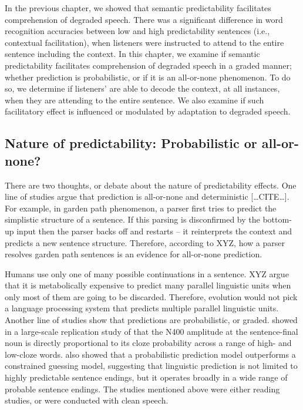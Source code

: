 \documentclass[a4paper, nobind]{templates/ociamthesis}
\begin{document}
In the previous chapter, we showed that semantic predictability facilitates comprehension of degraded speech.
There was a significant difference in word recognition accuracies between low and high predictability sentences (i.e., contextual facilitation), when listeners were instructed to attend to the entire sentence including the context.
In this chapter, we examine if semantic predictability facilitates comprehension of degraded speech in a graded manner; whether prediction is probabilistic, or if it is an all-or-none phenomenon.
To do so, we determine if listeners' are able to decode the context, at all instances, when they are attending to the entire sentence.
We also examine if such facilitatory effect is influenced or modulated by adaptation to degraded speech.

\hypertarget{nature-of-predictability-probabilistic-or-all-or-none}{%
\subsection{Nature of predictability: Probabilistic or all-or-none?}\label{nature-of-predictability-probabilistic-or-all-or-none}}

There are two thoughts, or debate about the nature of predictability effects.
One line of studies argue that prediction is all-or-none and deterministic {[}\ldots CITE\ldots{]}.
For example, in garden path phenomenon, a parser first tries to predict the simplistic structure of a sentence.
If this parsing is disconfirmed by the bottom-up input then the parser backs off and restarts -- it reinterprets the context and predicts a new sentence structure.
Therefore, according to XYZ, how a parser resolves garden path sentences is an evidence for all-or-none prediction.

Humans use only one of many possible continuations in a sentence.
XYZ argue that it is metabolically expensive to predict many parallel linguistic units when only most of them are going to be discarded.
Therefore, evolution would not pick a language processing system that predicts multiple parallel linguistic units.
Another line of studies show that predictions are probabilistic, or graded.
\textcite{Nieuwland2018} showed in a large-scale replication study of \textcite{Delong2005} that the N400 amplitude at the sentence-final noun is directly proportional to its cloze probability across a range of high- and low-cloze words.
\textcite{Heilbron2020} also showed that a probabilistic prediction model outperforms a constrained guessing model, suggesting that linguistic prediction is not limited to highly predictable sentence endings, but it operates broadly in a wide range of probable sentence endings.
The studies mentioned above were either reading studies, or were conducted with clean speech.
\end{document}
